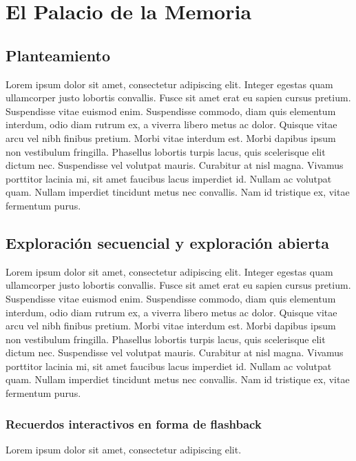 
\chapter{El Palacio de la Memoria}\label{ch:palacio-memoria}

\section{Planteamiento}

Lorem ipsum dolor sit amet, consectetur adipiscing elit. Integer egestas quam ullamcorper justo lobortis convallis. Fusce sit amet erat eu sapien cursus pretium. Suspendisse vitae euismod enim. Suspendisse commodo, diam quis elementum interdum, odio diam rutrum ex, a viverra libero metus ac dolor. Quisque vitae arcu vel nibh finibus pretium. Morbi vitae interdum est. Morbi dapibus ipsum non vestibulum fringilla. Phasellus lobortis turpis lacus, quis scelerisque elit dictum nec. Suspendisse vel volutpat mauris. Curabitur at nisl magna. Vivamus porttitor lacinia mi, sit amet faucibus lacus imperdiet id. Nullam ac volutpat quam. Nullam imperdiet tincidunt metus nec convallis. Nam id tristique ex, vitae fermentum purus.

\section{Exploración secuencial y exploración abierta}

Lorem ipsum dolor sit amet, consectetur adipiscing elit. Integer egestas quam ullamcorper justo lobortis convallis. Fusce sit amet erat eu sapien cursus pretium. Suspendisse vitae euismod enim. Suspendisse commodo, diam quis elementum interdum, odio diam rutrum ex, a viverra libero metus ac dolor. Quisque vitae arcu vel nibh finibus pretium. Morbi vitae interdum est. Morbi dapibus ipsum non vestibulum fringilla. Phasellus lobortis turpis lacus, quis scelerisque elit dictum nec. Suspendisse vel volutpat mauris. Curabitur at nisl magna. Vivamus porttitor lacinia mi, sit amet faucibus lacus imperdiet id. Nullam ac volutpat quam. Nullam imperdiet tincidunt metus nec convallis. Nam id tristique ex, vitae fermentum purus.

\subsection{Recuerdos interactivos en forma de flashback}

Lorem ipsum dolor sit amet, consectetur adipiscing elit.

